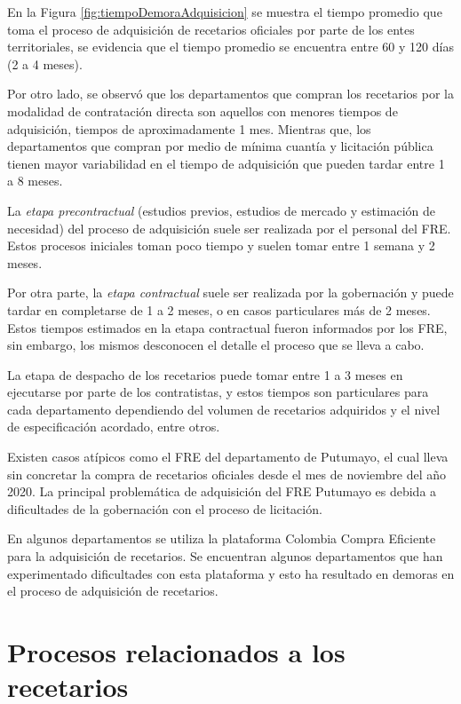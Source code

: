 \documentclass[
]{book}
\begin{document}
En la Figura \ref{fig:tiempoDemoraAdquisicion} se muestra el tiempo promedio que toma el proceso de adquisición de recetarios oficiales por parte de los entes territoriales, se evidencia que el tiempo promedio se encuentra entre 60 y 120 días (2 a 4 meses).

Por otro lado, se observó que los departamentos que compran los recetarios por la modalidad de contratación directa son aquellos con menores tiempos de adquisición, tiempos de aproximadamente 1 mes. Mientras que, los departamentos que compran por medio de mínima cuantía y licitación pública tienen mayor variabilidad en el tiempo de adquisición que pueden tardar entre 1 a 8 meses.

La \emph{etapa precontractual} (estudios previos, estudios de mercado y estimación de necesidad) del proceso de adquisición suele ser realizada por el personal del FRE. Estos procesos iniciales toman poco tiempo y suelen tomar entre 1 semana y 2 meses.

Por otra parte, la \emph{etapa contractual} suele ser realizada por la gobernación y puede tardar en completarse de 1 a 2 meses, o en casos particulares más de 2 meses. Estos tiempos estimados en la etapa contractual fueron informados por los FRE, sin embargo, los mismos desconocen el detalle el proceso que se lleva a cabo.

La etapa de despacho de los recetarios puede tomar entre 1 a 3 meses en ejecutarse por parte de los contratistas, y estos tiempos son particulares para cada departamento dependiendo del volumen de recetarios adquiridos y el nivel de especificación acordado, entre otros.

Existen casos atípicos como el FRE del departamento de Putumayo, el cual lleva sin concretar la compra de recetarios oficiales desde el mes de noviembre del año 2020. La principal problemática de adquisición del FRE Putumayo es debida a dificultades de la gobernación con el proceso de licitación.

En algunos departamentos se utiliza la plataforma Colombia Compra Eficiente para la adquisición de recetarios. Se encuentran algunos departamentos que han experimentado dificultades con esta plataforma y esto ha resultado en demoras en el proceso de adquisición de recetarios.

\hypertarget{procesos-relacionados-a-los-recetarios}{%
\section{Procesos relacionados a los recetarios}\label{procesos-relacionados-a-los-recetarios}}
\end{document}
